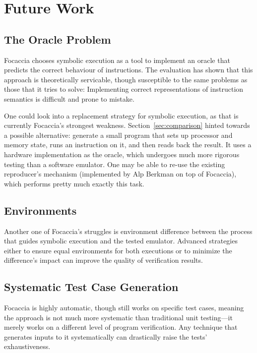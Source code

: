 \chapter{Future Work}

\section{The Oracle Problem}

Focaccia chooses symbolic execution as a tool to implement an oracle that predicts the correct behaviour of
instructions. The evaluation has shown that this approach is theoretically servicable, though susceptible to the same
problems as those that it tries to solve: Implementing correct representations of instruction semantics is difficult and
prone to mistake.

One could look into a replacement strategy for symbolic execution, as that is currently Focaccia's strongest weakness.
Section~\ref{sec:comparison} hinted towards a possible alternative: generate a small program that sets up processor and
memory state, runs an instruction on it, and then reads back the result. It uses a hardware implementation as the
oracle, which undergoes much more rigorous testing than a software emulator. One may be able to re-use the existing
reproducer's mechanism (implemented by Alp Berkman on top of Focaccia), which performs pretty much exactly this task.

\section{Environments}

Another one of Focaccia's struggles is environment difference between the process that guides symbolic execution and the
tested emulator. Advanced strategies either to ensure equal environments for both executions or to minimize the
difference's impact can improve the quality of verification results.

\section{Systematic Test Case Generation}

Focaccia is highly automatic, though still works on specific test cases, meaning the approach is not much more
systematic than traditional unit testing---it merely works on a different level of program verification. Any technique
that generates inputs to it systematically can drastically raise the tests' exhaustiveness.
